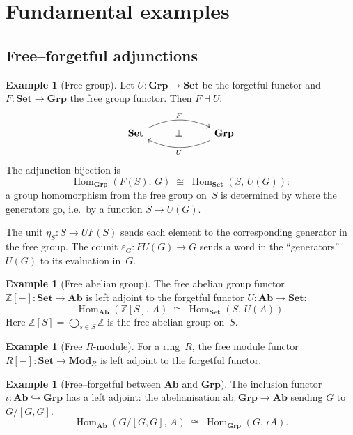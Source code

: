\documentclass[a4paper,12pt]{book}
\DeclareMathOperator{\Hom}{Hom}
\newcommand{\Set}{\mathbf{Set}}
\newcommand{\Grp}{\mathbf{Grp}}
\newcommand{\Ab}{\mathbf{Ab}}
\newcommand{\Mod}{\mathbf{Mod}}
\newcommand{\Z}{\mathbb{Z}}
\theoremstyle{definition}
\newtheorem{example}[definition]{Example}
\theoremstyle{plain}
\theoremstyle{remark}
\begin{document}
\section{Fundamental examples}\label{sec:adj-examples}

\subsection{Free--forgetful adjunctions}

\begin{example}[Free group]\label{ex:free-group}
Let $U\colon\Grp\to\Set$ be the forgetful functor and
$F\colon\Set\to\Grp$ the free group functor.
Then $F\dashv U$:
\[
\begin{tikzcd}
\Set
  \arrow[rr, bend left=25, "F", ""{name=F, below}]
& \bot &
\Grp
  \arrow[ll, bend left=25, "U", ""{name=G, above}]
\end{tikzcd}
\]
The adjunction bijection is
\[
    \Hom_\Grp(F(S),\,G) \;\cong\; \Hom_\Set(S,\,U(G)):
\]
a group homomorphism from the free group on~$S$ is determined by
where the generators go, i.e.\ by a function $S\to U(G)$.

The unit $\eta_S\colon S\to UF(S)$ sends each element to the
corresponding generator in the free group.
The counit $\varepsilon_G\colon FU(G)\to G$ sends a word in the
``generators'' $U(G)$ to its evaluation in~$G$.
\end{example}

\begin{example}[Free abelian group]\label{ex:free-abelian}
The free abelian group functor $\Z[-]\colon\Set\to\Ab$ is left adjoint
to the forgetful functor $U\colon\Ab\to\Set$:
\[
    \Hom_\Ab(\Z[S],\,A) \;\cong\; \Hom_\Set(S,\,U(A)).
\]
Here $\Z[S] = \bigoplus_{s\in S} \Z$ is the free abelian group on~$S$.
\end{example}

\begin{example}[Free $R$-module]\label{ex:free-module}
For a ring~$R$, the free module functor $R[-]\colon\Set\to\Mod_R$
is left adjoint to the forgetful functor.
\end{example}

\begin{example}[Free--forgetful between $\Ab$ and $\Grp$]%
\label{ex:abelianisation}
The inclusion functor $\iota\colon\Ab\hookrightarrow\Grp$ has a
left adjoint: the abelianisation $\mathrm{ab}\colon\Grp\to\Ab$
sending $G$ to $G/[G,G]$.
\[
    \Hom_\Ab(G/[G,G],\,A) \;\cong\; \Hom_\Grp(G,\,\iota A).
\]
\end{example}
\end{document}
